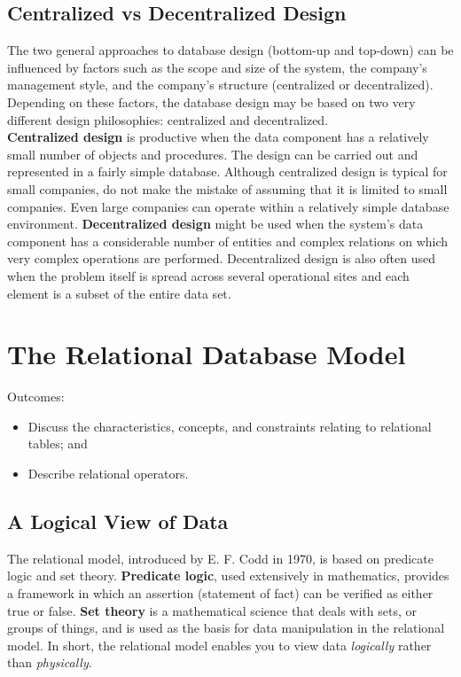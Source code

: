 \documentclass[a4paper, 12pt, titlepage]{report}
\begin{document}
\section{Centralized vs Decentralized Design}
The two general approaches to database design (bottom-up and top-down) can be influenced by factors such as the scope and size of the system, the company’s management style, and the company’s structure (centralized or decentralized). Depending on these factors, the database design may be based on two very different design philosophies: centralized and decentralized. \\
\textbf{Centralized design} is productive when the data component has a relatively small number of objects and procedures. The design can be carried out and represented in a
fairly simple database. Although centralized design is typical for small companies, do not make the mistake of assuming that it is limited to small companies. Even large companies can operate within a relatively simple database environment.
\textbf{Decentralized design} might be used when the system’s data component has a considerable number of entities and complex relations on which very complex operations are performed. Decentralized design is also often used when the problem itself is spread across several operational sites and each element is a subset of the entire data set.

\chapter{The Relational Database Model}
Outcomes:
\begin{itemize}
\item Discuss the characteristics, concepts, and constraints relating to relational tables; and
\item Describe relational operators.
\end{itemize}
\section{A Logical View of Data}
The relational model, introduced by E. F. Codd in 1970, is based on predicate logic and set theory. \textbf{Predicate logic}, used extensively in mathematics, provides a framework in which an assertion (statement of fact) can be verified as either true or false. \textbf{Set theory} is a mathematical science that deals with sets, or groups of things, and is used as the basis for data manipulation in the relational model. In short, the relational model enables you to view data \emph{logically} rather than \emph{physically}.
\end{document}
